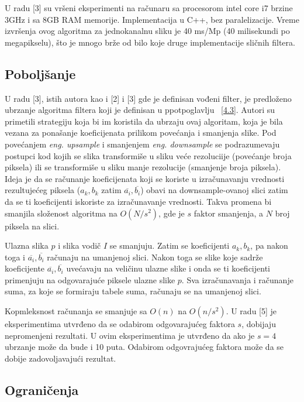 \documentclass[a4paper,12pt,titlepage]{article}
\begin{document}
U radu [3] su vršeni eksperimenti na računaru sa procesorom intel core i7 brzine 3GHz i sa 8GB RAM memorije. Implementacija u C++, bez paralelizacije. Vreme izvršenja ovog algoritma za jednokanalnu sliku je 40 ms/Mp (40 milisekundi po megapikselu), što je mnogo brže od bilo koje druge implementacije sličnih filtera.  

\subsection{Poboljšanje}%

U radu [3], istih autora kao i [2] i [3] gde je definisan vođeni filter, je predloženo ubrzanje algoritma filtera koji je definisan u ppotpoglavlju ~\ref{4.3}. Autori su primetili strategiju koja bi im koristila da ubrzaju ovaj algoritam, koja je bila vezana za ponašanje koeficijenata prilikom povećanja i smanjenja slike. Pod povećanjem \emph{eng. upsample} i smanjenjem \emph{eng. downsample} se podrazumevaju postupci kod kojih se slika transformiše u sliku veće rezoluciije (povećanje broja piksela) ili se transformiše u sliku manje rezolucije (smanjenje broja piksela). Ideja je da se računanje koeficijenata koji se koriste u izračunavanju vrednosti rezultujećeg piksela ($a_k, b_k$ zatim $\overline{a_i}, \overline{b_i}$) obavi na downsample-ovanoj slici zatim da se ti koeficijenti iskoriste za izračunavanje vrednosti. Takva promena bi smanjila složenost algoritma na $O(N / s^2)$, gde je $s$ faktor smanjenja, a $N$ broj piksela na slici. 

Ulazna slika $p$ i slika vodič $I$ se smanjuju. Zatim se koeficijenti $a_k, b_k$, pa nakon toga i $\overline{a_i}, \overline{b_i}$ računaju na umanjenoj slici. Nakon toga se slike koje sadrže koeficijente $\overline{a_i}, \overline{b_i}$ uvećavaju na veličinu ulazne slike i onda se ti koeficijenti primenjuju na odgovarajuće piksele ulazne slike $p$. Sva izračunavanja i računanje suma, za koje se formiraju tabele suma, računaju se na umanjenoj slici.

Kopmleksnost računanja se smanjuje sa $O(n)$ na $O(n / s^2)$. U radu [5] je eksperimentima utvrđeno da se odabirom odgovarajućeg faktora $s$, dobijaju nepromenjeni rezultati. U ovim eksperimentima je utvrđeno da ako je $s = 4$ ubrzanje može da bude i 10 puta. Odabirom odgovrajućeg faktora može da se dobije zadovoljavajući rezultat.   

\subsection{Ograničenja}%
\end{document}
